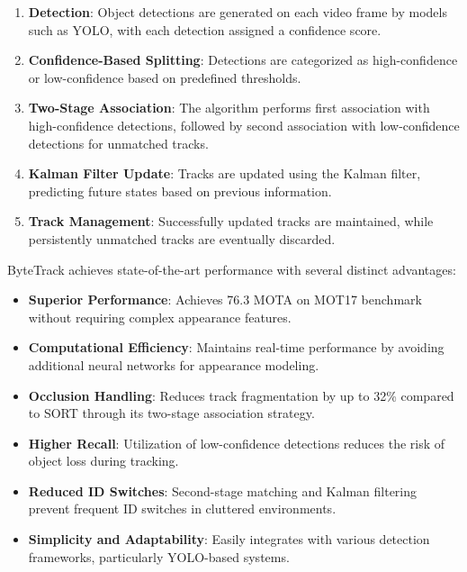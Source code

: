 \documentclass[11pt]{article}
\begin{document}
\begin{enumerate}
    \item \textbf{Detection}: Object detections are generated on each video frame by models such as YOLO, with each detection assigned a confidence score.
    
    \item \textbf{Confidence-Based Splitting}: Detections are categorized as high-confidence or low-confidence based on predefined thresholds.
    
    \item \textbf{Two-Stage Association}: The algorithm performs first association with high-confidence detections, followed by second association with low-confidence detections for unmatched tracks.
    
    \item \textbf{Kalman Filter Update}: Tracks are updated using the Kalman filter, predicting future states based on previous information.
    
    \item \textbf{Track Management}: Successfully updated tracks are maintained, while persistently unmatched tracks are eventually discarded.
\end{enumerate}

ByteTrack achieves state-of-the-art performance with several distinct advantages:

\begin{itemize}
    \item \textbf{Superior Performance}: Achieves 76.3 MOTA on MOT17 benchmark without requiring complex appearance features.
    
    \item \textbf{Computational Efficiency}: Maintains real-time performance by avoiding additional neural networks for appearance modeling.
    
    \item \textbf{Occlusion Handling}: Reduces track fragmentation by up to 32\% compared to SORT through its two-stage association strategy.
    
    \item \textbf{Higher Recall}: Utilization of low-confidence detections reduces the risk of object loss during tracking.
    
    \item \textbf{Reduced ID Switches}: Second-stage matching and Kalman filtering prevent frequent ID switches in cluttered environments.
    
    \item \textbf{Simplicity and Adaptability}: Easily integrates with various detection frameworks, particularly YOLO-based systems.
\end{itemize}
\end{document}
